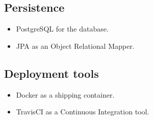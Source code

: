 \documentclass[11pt,a4paper]{article}
\begin{document}
\subsection{Persistence}
\begin{itemize}
	\item PostgreSQL for the database.
	\item JPA as an Object Relational Mapper.
\end{itemize}
\subsection{Deployment tools}
\begin{itemize}
	\item Docker as a shipping container.
	\item TravisCI as a Continuous Integration tool.
\end{itemize}
\end{document}
